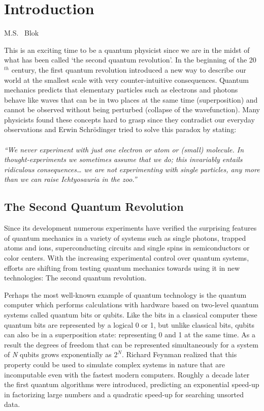 \graphicspath{{./ch_introduction/figures/}}

\chapter{Introduction}
\label{ch:intro}

\begin{center} 
    \vspace{-1cm} {M.S. ~Blok} 
\end{center}

This is an exciting time to be a quantum physicist since we are in the midst of what has been called `the second quantum revolution'.
In the beginning of the 20$^{th}$ century, the first quantum revolution introduced a new way to describe our world at the smallest scale with very counter-intuitive consequences. Quantum mechanics predicts that elementary particles such as electrons and photons behave like waves that can be in two places at the same time (superposition) and cannot be observed without being perturbed (collapse of the wavefunction). Many physicists found these concepts hard to grasp since they contradict our everyday observations and Erwin Schr\"{o}dinger tried to solve this paradox by stating: 
\\
\\
\textit{``We never experiment with just one electron or atom or (small) molecule. In  thought-experiments we sometimes assume that we do; this invariably entails ridiculous consequences… we are not experimenting with single particles, any more than we can raise Ichtyosauria in the zoo.''}
\\

\section{The Second Quantum Revolution}
Since its development numerous experiments have verified the surprising features of quantum mechanics in a variety of systems such as single photons, trapped atoms and ions, superconducting circuits and single spins in semiconductors or color centers. With the increasing experimental control over quantum systems, efforts are shifting from testing quantum mechanics towards using it in new technologies: The second quantum revolution.

Perhaps the most well-known example of quantum technology is the quantum computer which performs calculations with hardware based on two-level quantum systems called quantum bits or qubits. Like the bits in a classical computer these quantum bits are represented by a logical 0 or 1, but unlike classical bits, qubits can also be in a superposition state: representing 0 and 1 at the same time. As a result the degrees of freedom that can be represented simultaneously for a system of \textit{N} qubits grows exponentially as $2^N$. Richard Feynman realized that this property could be used to simulate complex systems in nature that are incomputable even with the fastest modern computers. Roughly a decade later the first quantum algorithms were introduced, predicting an exponential speed-up in factorizing large numbers and a quadratic speed-up for searching unsorted data.

